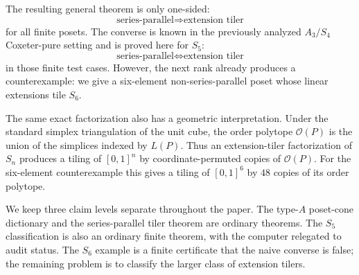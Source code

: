 The resulting general theorem is only one-sided:
\[
\text{series-parallel} \Longrightarrow \text{extension tiler}
\]
for all finite posets.  The converse is known in the previously analyzed
$A_3/S_4$ Coxeter-pure setting and is proved here for $S_5$:
\[
\text{series-parallel} \Longleftrightarrow \text{extension tiler}
\]
in those finite test cases.  However, the next rank already produces a
counterexample: we give a six-element non-series-parallel poset whose
linear extensions tile $S_6$.

The same exact factorization also has a geometric interpretation.  Under
the standard simplex triangulation of the unit cube, the order polytope
$\mathcal O(P)$ is the union of the simplices indexed by $L(P)$.  Thus an
extension-tiler factorization of $S_n$ produces a tiling of $[0,1]^n$ by
coordinate-permuted copies of $\mathcal O(P)$.  For the six-element
counterexample this gives a tiling of $[0,1]^6$ by $48$ copies of its
order polytope.

We keep three claim levels separate throughout the paper.  The type-$A$
poset-cone dictionary and the series-parallel tiler theorem are ordinary
theorems.  The $S_5$ classification is also an ordinary finite theorem,
with the computer relegated to audit status.  The $S_6$ example is a
finite certificate that the naive converse is false; the remaining
problem is to classify the larger class of extension tilers.
